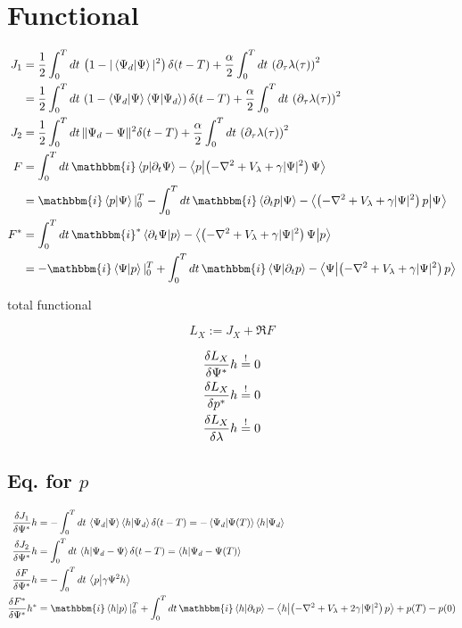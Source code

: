 \documentclass[10pt,a4paper]{article}
\newcommand{\iu}{\ensuremath{\mathbbm{i}}}
\newcommand{\intT}{\ensuremath{\int_0^T dt\,}}
\newcommand{\skalarprodukt}[2]{\left< #1 \vert #2 \right>}
\begin{document}
\section{Functional}

\begin{align}
J_1 &= \frac{1}{2} \intT \left( 1 - \vert\skalarprodukt{\Psi_d}{\Psi}\vert^2 \right) \delta(t-T) + \frac{\alpha}{2} \intT \left( \partial_{\tau} \lambda(\tau) \right)^2 \\
&= \frac{1}{2} \intT \left( 1 - \braket{\Psi_d}{\Psi}\braket{\Psi}{\Psi_d} \right) \delta(t-T) + \frac{\alpha}{2} \intT \left( \partial_{\tau} \lambda(\tau) \right)^2 \\
J_2 &= \frac{1}{2} \intT \Vert\Psi_d-\Psi\Vert^2 \delta(t-T) + \frac{\alpha}{2} \intT \left( \partial_{\tau} \lambda(\tau) \right)^2 \\
F &= \intT \iu \braket{p}{\partial_t\Psi} - \braket{p}{\left( -\laplacian + V_{\lambda} + \gamma \vert \Psi \vert^2 \right)\Psi} \\
&= \iu \braket{p}{\Psi}\vert_{0}^{T} - \intT \iu \braket{\partial_t p}{\Psi} - \braket{\left( -\laplacian + V_{\lambda} + \gamma \vert \Psi \vert^2 \right)p}{\Psi} \\
F^* &= \intT \iu^* \braket{\partial_t\Psi}{p} - \braket{\left( -\laplacian + V_{\lambda} + \gamma \vert \Psi \vert^2 \right)\Psi}{p} \\
&= -\iu \braket{\Psi}{p}\vert_{0}^{T} + \intT \iu \braket{\Psi}{\partial_t p} - \braket{\Psi}{\left( -\laplacian + V_{\lambda} + \gamma \vert \Psi \vert^2 \right)p} 
\end{align}

total functional

\begin{equation}
L_X := J_X + \Re{F}
\end{equation}

\begin{align}
\fdv{L_X}{\Psi^*} h &\stackrel{!}{=} 0 \\
\fdv{L_X}{p^*} h &\stackrel{!}{=} 0 \\
\fdv{L_X}{\lambda} h &\stackrel{!}{=} 0 
\end{align}

\subsection{Eq. for $p$}

\begin{align}
\fdv{J_1}{\Psi^*} h &= -\intT \braket{\Psi_d}{\Psi}\braket{h}{\Psi_d} \delta(t-T) = -\braket{\Psi_d}{\Psi(T)}\braket{h}{\Psi_d} \\
\fdv{J_2}{\Psi^*} h &= \intT \braket{h}{\Psi_d-\Psi} \delta(t-T) = \braket{h}{\Psi_d-\Psi(T)} \\
\fdv{F}{\Psi^*} h &= -\intT \braket{p}{\gamma\Psi^2 h} \\
\fdv{F^*}{\Psi^*} h^* &= \iu \braket{h}{p}\vert_{0}^{T} + \intT \iu \braket{h}{\partial_t p} - \braket{h}{\left( -\laplacian + V_{\lambda} + 2 \gamma \vert \Psi \vert^2 \right)p} + p(T) - p(0)
\end{align}
\end{document}
